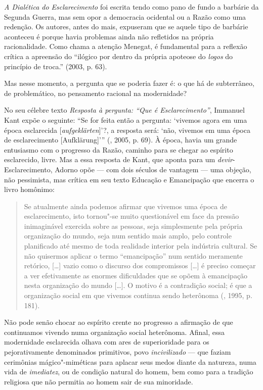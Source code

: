 \emph{A Dialética do Esclarecimento} foi escrita tendo como pano de
fundo a barbárie da Segunda Guerra, mas sem opor a democracia ocidental
ou a Razão como uma redenção. Os autores, antes do mais, expuseram que
se aquele tipo de barbárie aconteceu é porque havia problemas ainda não
refletidos na própria racionalidade. Como chama a atenção Menegat, é
fundamental para a reflexão crítica a apreensão do ``ilógico por dentro
da própria apoteose do \emph{logos} do princípio de troca.'' (2003, p.
63).

Mas nesse momento, a pergunta que se poderia fazer é: o que há de
subterrâneo, de problemático, no pensamento racional na modernidade?

No seu célebre texto \emph{Resposta à pergunta: ``Que é
Esclarecimento''}, Immanuel Kant expõe o seguinte: ``Se for feita então
a pergunta: `vivemos agora em uma época esclarecida
[\emph{aufgeklärten}]'?, a resposta será: `não, vivemos em uma época
de esclarecimento [Aufklärung]''' (, 2005, p. 69). À época,
havia um grande entusiasmo com o progresso da Razão, caminho para se
chegar ao espírito esclarecido, livre. Mas a essa resposta de Kant, que
aponta para um \emph{devir}-Esclarecimento, Adorno opõe --- com dois
séculos de vantagem --- uma objeção, não pessimista, mas crítica em seu
texto Educação e Emancipação que encerra o livro homônimo:

\begin{quote}
Se atualmente ainda podemos afirmar que vivemos uma época de
esclarecimento, isto tornou"-se muito questionável em face da pressão
inimaginável exercida sobre as pessoas, seja simplesmente pela própria
organização do mundo, seja num sentido mais amplo, pelo controle
planificado até mesmo de toda realidade interior pela indústria
cultural. Se não quisermos aplicar o termo ``emancipação'' num sentido
meramente retórico, [\ldots{}] vazio como o discurso dos compromissos
[\ldots{}] é preciso começar a ver efetivamente as enormes dificuldades
que se opõem à emancipação nesta organização do mundo [\ldots{}]. O
motivo é a contradição social; é que a organização social em que vivemos
continua sendo heterônoma (, 1995, p. 181).
\end{quote}

Não pode senão chocar ao espírito crente no progresso a afirmação de que
continuamos vivendo numa organização social heterônoma. Afinal, essa
modernidade esclarecida olhava com ares de superioridade para os
pejorativamente denominados primitivos, povo \emph{incivilizado} --- que
faziam cerimônias mágico"-miméticas para aplacar seus medos diante da
natureza, numa vida de \emph{imediatez}, ou de condição natural do
homem, bem como para a tradição religiosa que não permitia ao homem sair
de sua minoridade.

